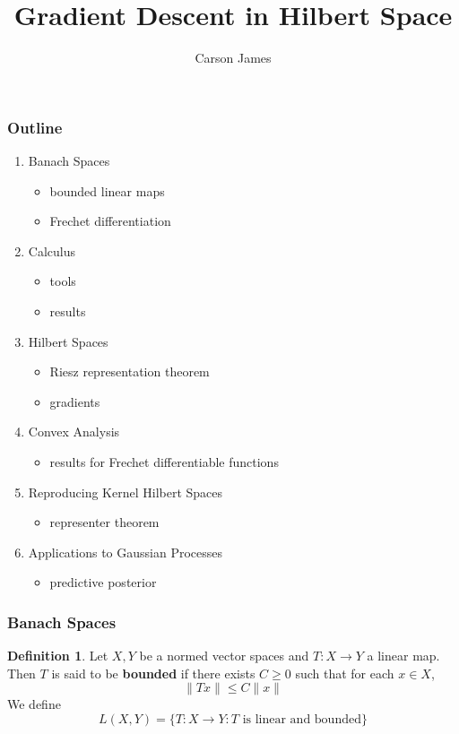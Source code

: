 \documentclass[notheorems]{beamer}
\title{Gradient Descent in Hilbert Space}
\author{Carson James}
\theoremstyle{definition}
\newtheorem{defn}[definition]{Definition}
\theoremstyle{definition}
\begin{document}
\frame{\titlepage}

\begin{frame}
\frametitle{Outline}
	\begin{enumerate}
	\item Banach Spaces
		\begin{itemize}
		\item bounded linear maps
		\item Frechet differentiation
		\end{itemize}
	\item Calculus 
		\begin{itemize}
		\item tools
		\item results
		\end{itemize}
	\item Hilbert Spaces
		\begin{itemize}
		\item Riesz representation theorem
		\item gradients
		\end{itemize}
	\item Convex Analysis 
		\begin{itemize}
		\item results for Frechet differentiable functions
		\end{itemize}
	\item Reproducing Kernel Hilbert Spaces
		\begin{itemize}
		\item representer theorem
		\end{itemize}
	\item Applications to Gaussian Processes
	\begin{itemize}
		\item predictive posterior 
		\end{itemize}
	
	\end{enumerate}
\end{frame}

\begin{frame}
\frametitle{Banach Spaces}
	
	\begin{defn}
		Let $X,Y$ be a normed vector spaces and $T:X \rightarrow Y$ a linear map. Then $T$ is said to be \textbf{bounded} if there exists $C \geq 0$ such that for each $x \in X$, $$\|Tx \|\leq C \|x \|$$ We define $$L(X,Y) = \{T:X \rightarrow Y: T \text{ is linear and bounded}\}$$
	\end{defn}
	\end{frame}
	
\end{document}
